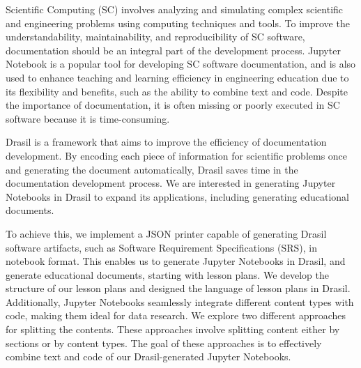 
Scientific Computing (SC) involves analyzing and simulating complex scientific 
and engineering problems using computing techniques and tools. To improve the 
understandability, maintainability, and reproducibility of SC software,  
documentation should be an integral part of the development process. Jupyter 
Notebook is a popular tool for developing SC software documentation, and is 
also used to enhance teaching and learning efficiency in engineering education 
due to its flexibility and benefits, such as the ability to combine text and 
code. Despite the importance of documentation, it is often missing or poorly 
executed in SC software because it is time-consuming. 

Drasil is a framework that aims to improve the efficiency of documentation 
development. By encoding each piece of information for scientific problems once 
and generating the document automatically, Drasil saves time in the 
documentation development process. We are interested in generating Jupyter 
Notebooks in Drasil to expand its applications, including generating 
educational documents.

To achieve this, we implement a JSON printer capable of generating Drasil 
software artifacts, such as Software Requirement Specifications (SRS), in 
notebook format. This enables us to generate Jupyter Notebooks in Drasil, and 
generate educational documents, starting with lesson plans. We develop the 
structure of our lesson plans and designed the language of lesson plans in 
Drasil. Additionally, Jupyter Notebooks seamlessly integrate different content 
types with code, making them ideal for data research. We explore two different 
approaches for splitting the contents. These approaches involve splitting 
content either by sections or by content types. The goal of these approaches is 
to effectively combine text and code of our Drasil-generated Jupyter Notebooks.